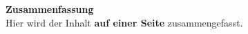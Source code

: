 \thispagestyle{fancy}
\Large\textbf{Zusammenfassung}\\ 

Hier wird der Inhalt \textbf{auf einer Seite} zusammengefasst.

